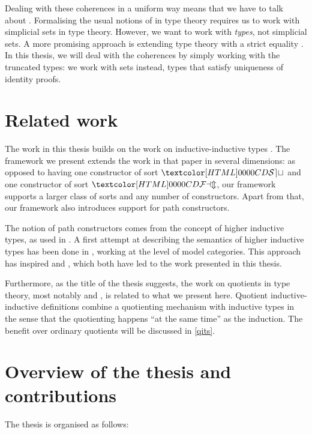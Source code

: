 Dealing with these coherences in a uniform way means that we have to
talk about \inftycats \cite{Camarena2013}. Formalising the usual
notions of \inftycat in type theory requires us to work with
simplicial sets in type theory. However, we want to work with
\emph{types}, not simplicial sets. A more promising approach is
extending type theory with a strict equality
\cite{Altenkirch2016ii,Altenkirch2016iii}. In this thesis, we will
deal with the coherences by simply working with the truncated types:
we work with sets instead, \ie types that satisfy uniqueness of
identity proofs.

\section{Related work}

The work in this thesis builds on the work on inductive-inductive
types \cite{NordvallForsberg2013,Altenkirch2011}. The framework we
present extends the work in that paper in several dimensions: as
opposed to having one constructor of sort $\SET$ and one constructor
of sort $\FAM$, our framework supports a larger class of sorts and any
number of constructors. Apart from that, our framework also introduces
support for path constructors.

The notion of path constructors comes from the concept of higher
inductive types, as used in \cite{UFP2013}. A first attempt at
describing the semantics of higher inductive types has been done in
\cite{Lumsdaine2013}, working at the level of model categories. This
approach has inspired \cite{Capriotti2014ii} and
\cite{Altenkirch2015ii}, which both have led to the work presented in
this thesis.

Furthermore, as the title of the thesis suggests, the work on
quotients in type theory, most notably \cite{Nuo2015} and
\cite{Hofmann1995}, is related to what we present here. Quotient
inductive-inductive definitions combine a quotienting mechanism with
inductive types in the sense that the quotienting happens ``at the
same time'' as the induction. The benefit over ordinary quotients will
be discussed in \cref{qits}.

\section{Overview of the thesis and contributions}

The thesis is organised as follows:

